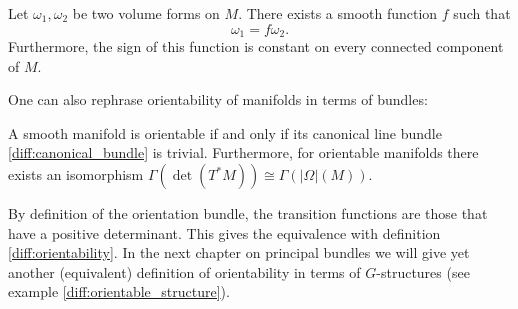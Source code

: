     \begin{property}
        Let $\omega_1,\omega_2$ be two volume forms on $M$. There exists a smooth function $f$ such that \[\omega_1 = f\omega_2.\] Furthermore, the sign of this function is constant on every connected component of $M$.
    \end{property}

    One can also rephrase orientability of manifolds in terms of bundles:
    \begin{property}[Orientability]
        A smooth manifold is orientable if and only if its canonical line bundle \ref{diff:canonical_bundle} is trivial. Furthermore, for orientable manifolds there exists an isomorphism $\Gamma(\det(T^*M))\cong\Gamma(|\Omega|(M))$.
    \end{property}

    \begin{remark}
        By definition of the orientation bundle, the transition functions are those that have a positive determinant. This gives the equivalence with definition \ref{diff:orientability}. In the next chapter on principal bundles we will give yet another (equivalent) definition of orientability in terms of $G$-structures (see example \ref{diff:orientable_structure}).
    \end{remark}

